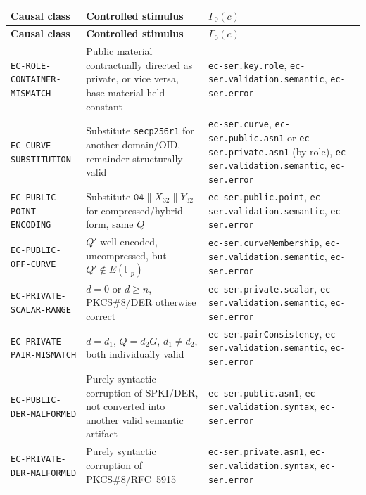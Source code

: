 \documentclass[11pt,a4paper]{article}
\begin{document}
\begin{longtable}{p{}p{}p{}}
\toprule
\textbf{Causal class} & \textbf{Controlled stimulus} & \textbf{$\Gamma_0(c)$}\\
\midrule
\endfirsthead
\toprule
\textbf{Causal class} & \textbf{Controlled stimulus} & \textbf{$\Gamma_0(c)$}\\
\midrule
\endhead

\texttt{EC-ROLE-CONTAINER-MISMATCH} & Public material contractually directed as private, or vice versa, base material held constant & \texttt{ec-ser.key.role}, \texttt{ec-ser.validation.semantic}, \texttt{ec-ser.error}\\

\texttt{EC-CURVE-SUBSTITUTION} & Substitute \texttt{secp256r1} for another domain/OID, remainder structurally valid & \texttt{ec-ser.curve}, \texttt{ec-ser.public.asn1} or \texttt{ec-ser.private.asn1} (by role), \texttt{ec-ser.validation.semantic}, \texttt{ec-ser.error}\\

\texttt{EC-PUBLIC-POINT-ENCODING} & Substitute $\texttt{04}\|X_{32}\|Y_{32}$ for compressed/hybrid form, same $Q$ & \texttt{ec-ser.public.point}, \texttt{ec-ser.validation.semantic}, \texttt{ec-ser.error}\\

\texttt{EC-PUBLIC-OFF-CURVE} & $Q'$ well-encoded, uncompressed, but $Q'\notin E(\mathbb{F}_p)$ & \texttt{ec-ser.curveMembership}, \texttt{ec-ser.validation.semantic}, \texttt{ec-ser.error}\\

\texttt{EC-PRIVATE-SCALAR-RANGE} & $d=0$ or $d\ge n$, PKCS\#8/DER otherwise correct & \texttt{ec-ser.private.scalar}, \texttt{ec-ser.validation.semantic}, \texttt{ec-ser.error}\\

\texttt{EC-PRIVATE-PAIR-MISMATCH} & $d=d_1$, $Q=d_2G$, $d_1\neq d_2$, both individually valid & \texttt{ec-ser.pairConsistency}, \texttt{ec-ser.validation.semantic}, \texttt{ec-ser.error}\\

\texttt{EC-PUBLIC-DER-MALFORMED} & Purely syntactic corruption of SPKI/DER, not converted into another valid semantic artifact & \texttt{ec-ser.public.asn1}, \texttt{ec-ser.validation.syntax}, \texttt{ec-ser.error}\\

\texttt{EC-PRIVATE-DER-MALFORMED} & Purely syntactic corruption of PKCS\#8/RFC~5915 & \texttt{ec-ser.private.asn1}, \texttt{ec-ser.validation.syntax}, \texttt{ec-ser.error}\\


\end{longtable}
\end{document}
